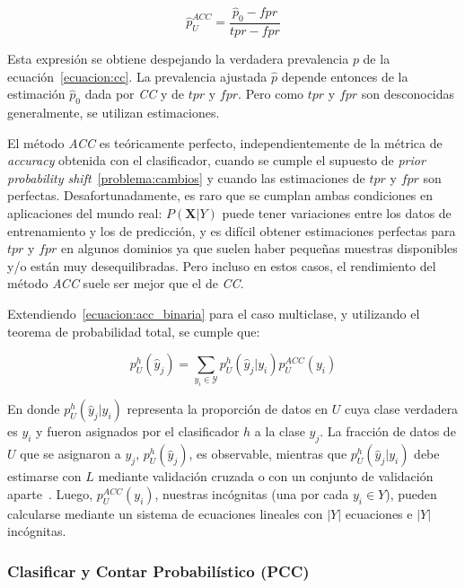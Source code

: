 \begin{equation}
    \hat p^{ACC}_{U} = \frac{\hat p_0-fpr}{tpr-fpr}\label{ecuacion:acc_binaria}
\end{equation}

Esta expresión se obtiene despejando la verdadera prevalencia $p$ de la
ecuación~\ref{ecuacion:cc}. La prevalencia ajustada $\hat p$ depende entonces de
la estimación $\hat p_0$ dada por {\it CC\/} y de $tpr$ y $fpr$. Pero como $tpr$
y $fpr$ son desconocidas generalmente, se utilizan estimaciones.

El método {\it ACC\/} es teóricamente perfecto, independientemente de la métrica
de {\it accuracy\/} obtenida con el clasificador, cuando se cumple el supuesto
de {\it prior probability shift\/}~\ref{problema:cambios} y cuando las
estimaciones de $tpr$ y $fpr$ son perfectas. Desafortunadamente, es raro que se
cumplan ambas condiciones en aplicaciones del mundo real: $P(\mathbf{X}|Y)$
puede tener variaciones entre los datos de entrenamiento y los de predicción, y
es difícil obtener estimaciones perfectas para $tpr$ y $fpr$ en algunos dominios
ya que suelen haber pequeñas muestras disponibles y/o están muy desequilibradas.
Pero incluso en estos casos, el rendimiento del método {\it ACC\/} suele ser
mejor que el de {\it CC}.

Extendiendo~\ref{ecuacion:acc_binaria} para el caso multiclase, y utilizando el
teorema de probabilidad total, se cumple que:

\begin{equation}
    p_{U}^{h}(\hat y_j) = \sum _{y_i\in {\mathcal {Y}}}{p^{h}_{U}(\hat y_j|y_i)p^{ACC}_U(y_i)}\label{ecuacion:acc_multiclase}
\end{equation}

En donde $p^{h}_{U}(\hat y_j|y_i)$ representa la proporción de datos en $U$ cuya
clase verdadera es $y_i$ y fueron asignados por el clasificador $h$ a la clase
$y_j$. La fracción de datos de $U$ que se asignaron a $y_j$, $p_{U}^{h}(\hat
y_j)$, es observable, mientras que $p^{h}_{U}(\hat y_j|y_i)$ debe estimarse con
$L$ mediante validación cruzada o con un conjunto de validación
aparte~\cite{barranquero2013study, forman2005counting, forman2008quantifying}.
Luego, $p^{ACC}_U(y_i)$, nuestras incógnitas (una por cada $y_i \in Y$), pueden
calcularse mediante un sistema de ecuaciones lineales con $|Y|$ ecuaciones e
$|Y|$ incógnitas.

\subsubsection{Clasificar y Contar Probabilístico (PCC)}

